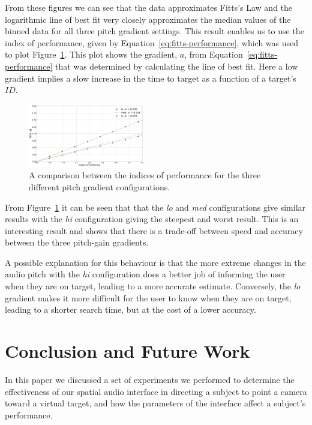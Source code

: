 \documentclass[format=sigconf, review=true, screen=true, anonymous=true]{acmart}
\begin{document}
From these figures we can see that the data approximates Fitts's Law and the logarithmic line of best fit very closely approximates the median values of the binned data for all three pitch gradient settings. This result enables us to use the index of performance, given by Equation~\ref{eq:fitts-performance}, which was used to plot Figure~\ref{fig:fitts-performance}. This plot shows the gradient, $a$, from Equation~\ref{eq:fitts-performance} that was determined by calculating the line of best fit. Here a low gradient implies a slow increase in the time to target as a function of a target's $ID$. 

\begin{figure}
  \centering
  \includegraphics[width=0.45\textwidth]{figures/fitts_performance.png}
  \caption{A comparison between the indices of performance for the three different pitch gradient configurations.}
  \label{fig:fitts-performance}
\end{figure}

From Figure~\ref{fig:fitts-performance} it can be seen that that the \emph{lo} and \emph{med} configurations give similar results with the \emph{hi} configuration giving the steepest and worst result. This is an interesting result and shows that there is a trade-off between speed and accuracy between the three pitch-gain gradients. 

A possible explanation for this behaviour is that the more extreme changes in the audio pitch with the \emph{hi} configuration does a better job of informing the user when they are on target, leading to a more accurate estimate. Conversely, the \emph{lo} gradient makes it more difficult for the user to know when they are on target, leading to a shorter search time, but at the cost of a lower accuracy. 

\section{Conclusion and Future Work}
\label{sec:conclusion}

In this paper we discussed a set of experiments we performed to determine the effectiveness of our spatial audio interface in directing a subject to point a camera toward a virtual target, and how the parameters of the interface affect a subject's performance. 
\end{document}

